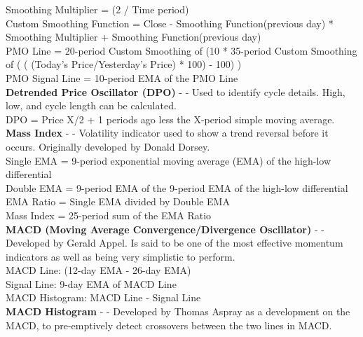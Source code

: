 \documentclass[12pt,a4paper]{article}
\begin{document}
\noindent
Smoothing Multiplier = (2 / Time period)\\
Custom Smoothing Function = {Close - Smoothing Function(previous day)} * Smoothing Multiplier + Smoothing Function(previous day) \\
PMO Line = 20-period Custom Smoothing of (10 * 35-period Custom Smoothing of ( ( (Today's Price/Yesterday's Price) * 100) - 100) )\\
PMO Signal Line = 10-period EMA of the PMO Line\\

\iffalse
[]
\fi

\noindent
\textbf{Detrended Price Oscillator (DPO)} - \cite{Murphy1999} - Used to identify cycle details. High, low, and cycle length can be calculated.\\

\noindent
DPO = Price {X/2 + 1} periods ago less the X-period simple moving average.\\

\iffalse
[]
\fi

\noindent
\textbf{Mass Index} - \cite{Murphy1999} - Volatility indicator used to show a trend reversal before it occurs.  Originally developed by Donald Dorsey. \\

\noindent
Single EMA = 9-period exponential moving average (EMA) of the high-low differential \\
Double EMA = 9-period EMA of the 9-period EMA of the high-low differential \\
EMA Ratio = Single EMA divided by Double EMA \\
Mass Index = 25-period sum of the EMA Ratio \\

\iffalse
[]
\fi

\noindent
\textbf{MACD (Moving Average Convergence/Divergence Oscillator)} - \cite{Appel2005} - Developed by Gerald Appel. Is said to be one of the most effective momentum indicators as well as being very simplistic to perform. \\

\noindent
MACD Line: (12-day EMA - 26-day EMA)\\
Signal Line: 9-day EMA of MACD Line\\
MACD Histogram: MACD Line - Signal Line\\

\iffalse
[]
\fi

\noindent
\textbf{MACD Histogram} - \cite{Murphy1999} - Developed by Thomas Aspray as a development on the MACD, to pre-emptively detect crossovers between the two lines in MACD.\\
\end{document}
